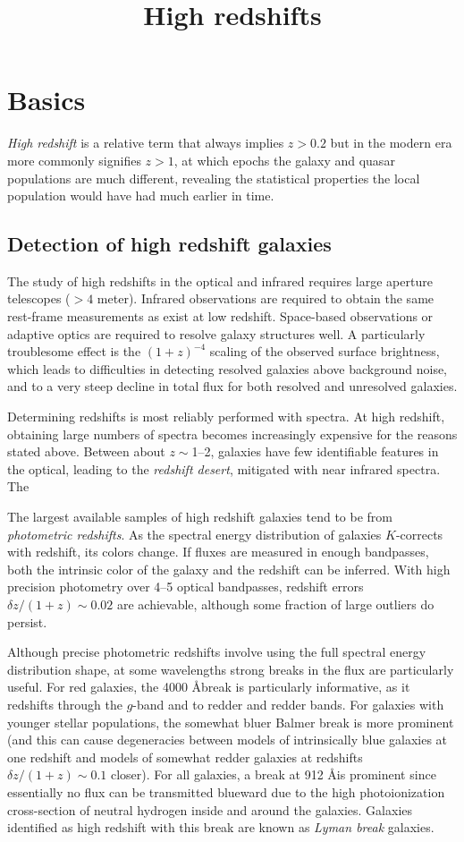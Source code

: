 \title{\bf High redshifts}

\section{Basics}

{\it High redshift} is a relative term that always implies $z>0.2$ but
in the modern era more commonly signifies $z>1$, at which epochs the
galaxy and quasar populations are much different, revealing the
statistical properties the local population would have had much
earlier in time.

\subsection{Detection of high redshift galaxies}

The study of high redshifts in the optical and infrared requires large
aperture telescopes ($> 4$ meter). Infrared observations are required
to obtain the same rest-frame measurements as exist at low
redshift. Space-based observations or adaptive optics are required to
resolve galaxy structures well. A particularly troublesome effect is
the $(1+z)^{-4}$ scaling of the observed surface brightness, which
leads to difficulties in detecting resolved galaxies above background
noise, and to a very steep decline in total flux for both resolved and
unresolved galaxies.

Determining redshifts is most reliably performed with spectra. At high
redshift, obtaining large numbers of spectra becomes increasingly
expensive for the reasons stated above. Between about $z\sim$1--2,
galaxies have few identifiable features in the optical, leading to the
{\it redshift desert}, mitigated with near infrared spectra. The

The largest available samples of high redshift galaxies tend to be
from {\it photometric redshifts}. As the spectral energy distribution
of galaxies $K$-corrects with redshift, its colors change. If fluxes
are measured in enough bandpasses, both the intrinsic color of the
galaxy and the redshift can be inferred. With high precision
photometry over 4--5 optical bandpasses, redshift errors $\delta
z/(1+z) \sim 0.02$ are achievable, although some fraction of large
outliers do persist.

Although precise photometric redshifts involve using the full spectral
energy distribution shape, at some wavelengths strong breaks in the
flux are particularly useful. For red galaxies, the 4000 \AA break is
particularly informative, as it redshifts through the $g$-band and to
redder and redder bands. For galaxies with younger stellar
populations, the somewhat bluer Balmer break is more prominent (and
this can cause degeneracies between models of intrinsically blue
galaxies at one redshift and models of somewhat redder galaxies at
redshifts $\delta z / (1+z) \sim 0.1$ closer). For all galaxies, a
break at 912 \AA is prominent since essentially no flux can be
transmitted blueward due to the high photoionization cross-section of
neutral hydrogen inside and around the galaxies. Galaxies identified
as high redshift with this break are known as {\it Lyman break}
galaxies.

